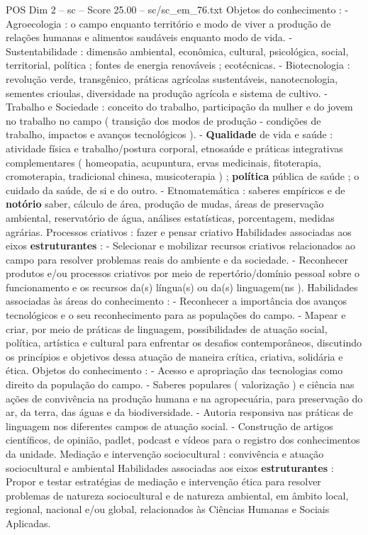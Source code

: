 \begin{textsample}{POS Dim 2 – sc – Score 25.00 – sc/sc\_em\_76.txt}
Objetos do conhecimento : - Agroecologia : o campo enquanto território e modo de viver a produção de relações humanas e alimentos saudáveis enquanto modo de vida. - Sustentabilidade : dimensão ambiental, econômica, cultural, psicológica, social, territorial, política ; fontes de energia renováveis ; ecotécnicas. - Biotecnologia : revolução verde, transgênico, práticas agrícolas sustentáveis, nanotecnologia, sementes crioulas, diversidade na produção agrícola e sistema de cultivo. - Trabalho e Sociedade : conceito do trabalho, participação da mulher e do jovem no trabalho no campo ( transição dos modos de produção - condições de trabalho, impactos e avanços tecnológicos ). - \textbf{Qualidade} de vida e saúde : atividade física e trabalho/postura corporal, etnosaúde e práticas integrativas complementares ( homeopatia, acupuntura, ervas medicinais, fitoterapia, cromoterapia, tradicional chinesa, musicoterapia ) ; \textbf{política} pública de saúde ; o cuidado da saúde, de si e do outro. - Etnomatemática : saberes empíricos e de \textbf{notório} saber, cálculo de área, produção de mudas, áreas de preservação ambiental, reservatório de água, análises estatísticas, porcentagem, medidas agrárias.
Processos criativos : fazer e pensar criativo Habilidades associadas aos eixos \textbf{estruturantes} : - Selecionar e mobilizar recursos criativos relacionados ao campo para resolver problemas reais do ambiente e da sociedade. - Reconhecer produtos e/ou processos criativos por meio de repertório/domínio pessoal sobre o funcionamento e os recursos da(s) língua(s) ou da(s) linguagem(ns ).
Habilidades associadas às áreas do conhecimento : - Reconhecer a importância dos avanços tecnológicos e o seu reconhecimento para as populações do campo. - Mapear e criar, por meio de práticas de linguagem, possibilidades de atuação social, política, artística e cultural para enfrentar os desafios contemporâneos, discutindo os princípios e objetivos dessa atuação de maneira crítica, criativa, solidária e ética.
Objetos do conhecimento : - Acesso e apropriação das tecnologias como direito da população do campo. - Saberes populares ( valorização ) e ciência nas ações de convivência na produção humana e na agropecuária, para preservação do ar, da terra, das águas e da biodiversidade. - Autoria responsiva nas práticas de linguagem nos diferentes campos de atuação social. - Construção de artigos científicos, de opinião, padlet, podcast e vídeos para o registro dos conhecimentos da unidade.
Mediação e intervenção sociocultural : convivência e atuação sociocultural e ambiental Habilidades associadas aos eixos \textbf{estruturantes} : Propor e testar estratégias de mediação e intervenção ética para resolver problemas de natureza sociocultural e de natureza ambiental, em âmbito local, regional, nacional e/ou global, relacionados às Ciências Humanas e Sociais Aplicadas.

\end{textsample}
